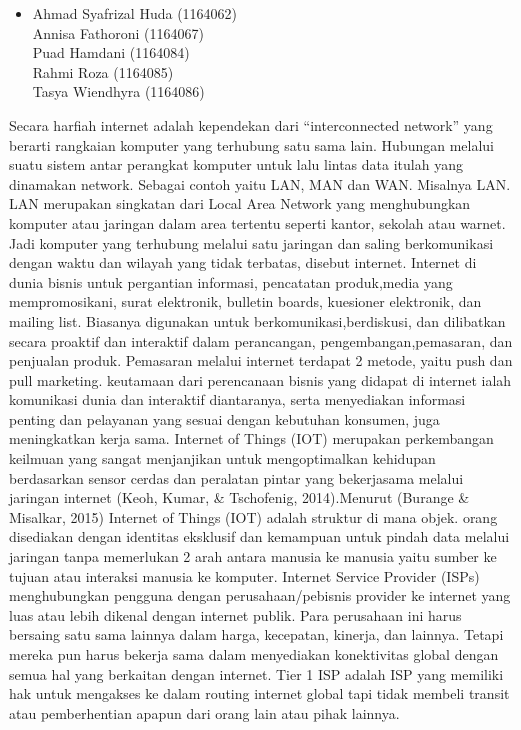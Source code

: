 \documentclass[12pt, a4paper]{article}
\begin{document}
\begin{itemize}
        \item
        Ahmad Syafrizal Huda (1164062) \\
        Annisa Fathoroni (1164067) \\
        Puad Hamdani (1164084) \\
        Rahmi Roza (1164085) \\
        Tasya Wiendhyra (1164086) \\
\end{itemize}
    Secara harfiah internet adalah kependekan dari “interconnected network” yang berarti rangkaian komputer yang terhubung satu sama lain. Hubungan melalui suatu sistem antar perangkat komputer untuk lalu lintas data itulah yang dinamakan network. Sebagai contoh yaitu LAN, MAN dan WAN. Misalnya LAN. LAN merupakan singkatan dari Local Area Network yang menghubungkan komputer atau jaringan dalam area tertentu seperti kantor, sekolah atau warnet. Jadi komputer yang terhubung melalui satu jaringan dan saling berkomunikasi dengan waktu dan wilayah yang tidak terbatas, disebut internet.
    Internet di dunia bisnis untuk pergantian informasi, pencatatan produk,media yang mempromosikani, surat elektronik, bulletin boards, kuesioner elektronik, dan mailing list. Biasanya digunakan untuk berkomunikasi,berdiskusi, dan dilibatkan secara proaktif dan interaktif dalam perancangan, pengembangan,pemasaran, dan penjualan produk. Pemasaran melalui internet terdapat 2 metode, yaitu push dan pull marketing. keutamaan dari perencanaan bisnis yang didapat di internet ialah komunikasi dunia dan interaktif diantaranya, serta menyediakan informasi penting dan pelayanan yang sesuai dengan kebutuhan konsumen, juga meningkatkan kerja sama.
    Internet of Things (IOT) merupakan perkembangan keilmuan yang sangat menjanjikan untuk mengoptimalkan kehidupan berdasarkan sensor cerdas dan peralatan pintar yang bekerjasama melalui jaringan internet (Keoh, Kumar, & Tschofenig, 2014).Menurut (Burange & Misalkar, 2015) Internet of Things (IOT) adalah struktur di mana objek. orang disediakan dengan identitas eksklusif dan kemampuan untuk pindah data melalui jaringan tanpa memerlukan 2 arah antara manusia ke manusia yaitu sumber ke tujuan atau interaksi manusia ke komputer.
    Internet Service Provider (ISPs) menghubungkan pengguna dengan perusahaan/pebisnis provider ke internet yang luas atau lebih dikenal dengan internet publik. Para perusahaan ini harus bersaing satu sama lainnya dalam harga, kecepatan, kinerja, dan lainnya. Tetapi mereka pun harus bekerja sama dalam menyediakan konektivitas global dengan semua hal yang berkaitan dengan internet. Tier 1 ISP adalah ISP yang memiliki hak untuk mengakses ke dalam routing internet global tapi tidak membeli transit atau pemberhentian apapun dari orang lain atau pihak lainnya.
\end{document}
